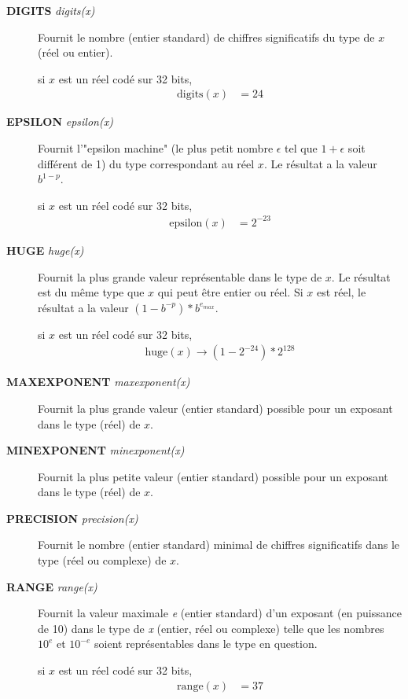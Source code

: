 \documentclass[a4paper,twoside]{article}
\begin{document}
\begin{description}
\item[\textbf{DIGITS} \emph{digits(x)}] Fournit le nombre (entier standard) de chiffres significatifs du type de $x$ (réel ou entier). 
\begin{exemple}
si $x$ est un réel codé sur 32 bits, 
\begin{align}
\mathrm{digits}(x)  &= 24
\end{align}
\end{exemple}

\item[\textbf{EPSILON} \emph{epsilon(x)}] Fournit l'"epsilon machine" (le plus petit nombre $\epsilon$ tel que $1+\epsilon$ soit différent de 1) du type correspondant au réel $x$. Le résultat a la valeur $b^{1-p}$. 
\begin{exemple}
si $x$ est un réel codé sur 32 bits, 
\begin{align}
\mathrm{epsilon}(x)  &= 2^{-23}
\end{align}
\end{exemple}

\item[\textbf{HUGE} \emph{huge(x)}] Fournit la plus grande valeur représentable dans le type de $x$. Le résultat est du même type que $x$ qui peut être entier ou réel. Si $x$ est réel, le résultat a la valeur $(1-b^{-p})*b^{e_{max}}$.
\begin{exemple}
si $x$ est un réel codé sur 32 bits, 
\begin{align}
\mathrm{huge}(x) \rightarrow (1-2^{-24})*2^{128}
\end{align}
\end{exemple}

\item[\textbf{MAXEXPONENT} \emph{maxexponent(x)}] Fournit la plus grande valeur (entier standard) possible pour un exposant dans le type (réel) de $x$.

\item[\textbf{MINEXPONENT} \emph{minexponent(x)}] Fournit la plus petite valeur (entier standard) possible pour un exposant dans le type (réel) de $x$.

\item[\textbf{PRECISION} \emph{precision(x)}] Fournit le nombre (entier standard) minimal de chiffres significatifs dans le type (réel ou complexe) de $x$.

\item[\textbf{RANGE} \emph{range(x)}] Fournit la valeur maximale \emph{e} (entier standard) d'un exposant (en puissance de 10) dans le type de \emph{x} (entier, réel ou complexe) telle que les nombres $10^{e}$ et $10^{-e}$ soient représentables dans le type en question. 
\begin{exemple}
si $x$ est un réel codé sur 
32 bits, 
\begin{align}
\mathrm{range}(x)  &= 37
\end{align}
\end{exemple}


\end{description}
\end{document}
